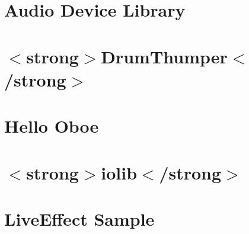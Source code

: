\let\mypdfximage\pdfximage\def\pdfximage{\immediate\mypdfximage}\documentclass[twoside]{book}
\newcommand{\+}{\discretionary{\mbox{\scriptsize$\hookleftarrow$}}{}{}}
\begin{document}
\chapter{Audio Device Library}
\label{md__c_1__users_fab_src__github_branches__neural_amp_modeler_plugin_i_plug2__dependencies__build_6eb309919754d69d85f76dea5e0ee029}

\chapter{$<$strong$>$Drum\+Thumper$<$/strong$>$}
\label{md__c_1__users_fab_src__github_branches__neural_amp_modeler_plugin_i_plug2__dependencies__build_ddf338ca0a0a445fd0d8f07b8d452aee}

\chapter{Hello Oboe}
\label{md__c_1__users_fab_src__github_branches__neural_amp_modeler_plugin_i_plug2__dependencies__build_416a5cb47965c0379509365e2b36921a}

\chapter{$<$strong$>$iolib$<$/strong$>$}
\label{md__c_1__users_fab_src__github_branches__neural_amp_modeler_plugin_i_plug2__dependencies__build_7514b947c80393229cb799545a80dadc}

\chapter{Live\+Effect Sample}
\label{md__c_1__users_fab_src__github_branches__neural_amp_modeler_plugin_i_plug2__dependencies__build_1e80eb12acbb3450eb32b64c63411418}

\end{document}
